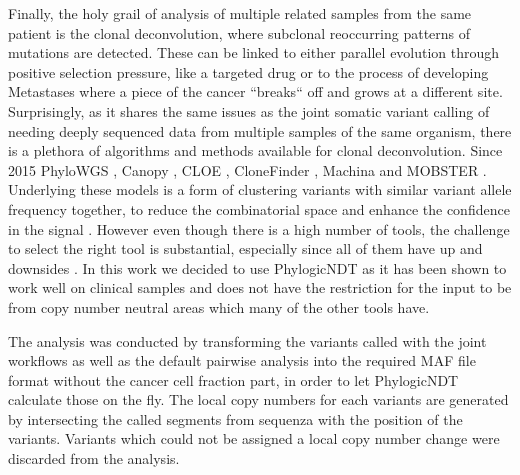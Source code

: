 Finally, the holy grail of analysis of multiple related samples from the same patient is the clonal deconvolution, where subclonal reoccurring patterns of mutations are detected. These can be linked to either parallel evolution through positive selection pressure, like a targeted drug or to the process of developing Metastases where a piece of the cancer ``breaks`` off and grows at a different site.
Surprisingly, as it shares the same issues as the joint somatic variant calling of needing deeply sequenced data from multiple samples of the same organism, there is a plethora of algorithms and methods available for clonal deconvolution. Since 2015 PhyloWGS \cite{Deshwar2015}, Canopy \cite{Jiang2016}, CLOE \cite{Marass2016}, CloneFinder \cite{Miura2018}, Machina \cite{ElKebir2018} and MOBSTER \cite{Caravagna2020}. Underlying these models is a form of clustering variants with similar variant allele frequency together, to reduce the combinatorial space and enhance the confidence in the signal \cite{Tarabichi2021}. However even though there is a high number of tools, the challenge to select the right tool is substantial, especially since all of them have up and downsides \cite{Miura2020}. In this work we decided to use PhylogicNDT \cite{Leshchiner2018} as it has been shown to work well on clinical samples \cite{Gerstung2020} and does not have the restriction for the input to be from copy number neutral areas which many of the other tools have.

The analysis was conducted by transforming the variants called with the joint workflows as well as the default pairwise analysis into the required MAF file format without the cancer cell fraction part, in order to let PhylogicNDT calculate those on the fly. The local copy numbers for each variants are generated by intersecting the called segments from sequenza with the position of the variants. Variants which could not be assigned a local copy number change were discarded from the analysis.

